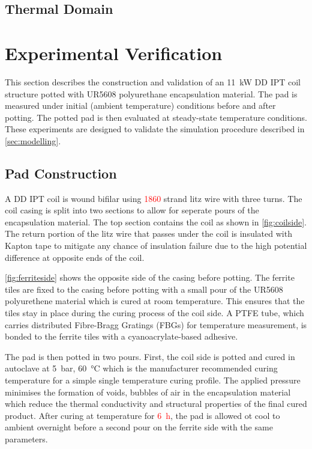 \documentclass[conference]{IEEEtran}
\begin{document}
\subsection{Thermal Domain}

\lipsum[2]

\section{Experimental Verification}
\label{sec:experiments}

This section describes the construction and validation of an \SI{11}{\kilo\watt} DD IPT coil structure potted with UR5608 polyurethane encapsulation material. 
The pad is measured under initial (ambient temperature) conditions before and after potting. 
The potted pad is then evaluated at steady-state temperature conditions. 
These experiments are designed to validate the simulation procedure described in \cref{sec:modelling}. 

\subsection{Pad Construction}

A DD IPT coil is wound bifilar using \textcolor{red}{1860} strand litz wire with three turns. 
The coil casing is split into two sections to allow for seperate pours of the encapsulation material. 
The top section contains the coil as shown in \cref{fig:coilside}. 
The return portion of the litz wire that passes under the coil is insulated with Kapton tape to mitigate any chance of insulation failure due to the high potential difference at opposite ends of the coil. 

\cref{fig:ferriteside} shows the opposite side of the casing before potting. 
The ferrite tiles are fixed to the casing before potting with a small pour of the UR5608 polyurethene material which is cured at room temperature. 
This ensures that the tiles stay in place during the curing process of the coil side. 
A PTFE tube, which carries distributed Fibre-Bragg Gratings (FBGs) for temperature measurement, is bonded to the ferrite tiles with a cyanoacrylate-based adhesive. 

The pad is then potted in two pours. 
First, the coil side is potted and cured in autoclave at \SI{5}{\bar}, \SI{60}{\celsius} which is the manufacturer recommended curing temperature for a simple single temperature curing profile. 
The applied pressure minimises the formation of voids, bubbles of air in the encapsulation material which reduce the thermal conductivity and structural properties of the final cured product. 
After curing at temperature for \textcolor{red}{\SI{6}{\hour}}, the pad is allowed ot cool to ambient overnight before a second pour on the ferrite side with the same parameters. 
\end{document}
